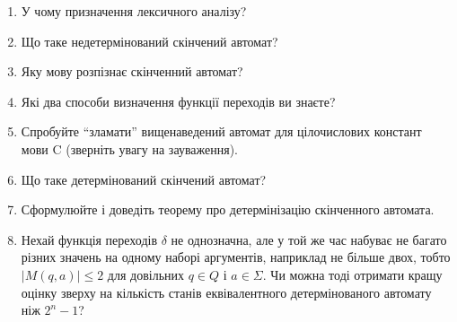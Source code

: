 \begin{enumerate}
	\item У чому призначення лексичного аналізу? %
	\item Що таке недетермінований скінчений автомат? %
	\item Яку мову розпізнає скінченний автомат? %
	\item Які два способи визначення функції переходів ви знаєте? %
	\item Спробуйте ``зламати'' вищенаведений автомат для цілочислових констант мови C (зверніть увагу на зауваження). %
	\item Що таке детермінований скінчений автомат? %
	\item Сформулюйте і доведіть теорему про детермінізацію скінченного автомата.
	\item Нехай функція переходів $\delta$ не однозначна, але у той же час набуває не багато різних значень на одному наборі аргументів, наприклад не більше двох, тобто $|M(q, a)| \le 2$ для довільних $q \in Q$ і $a \in \Sigma$. Чи можна тоді отримати кращу оцінку зверху на кількість станів еквівалентного детермінованого автомату ніж $2^n - 1$?
\end{enumerate}
